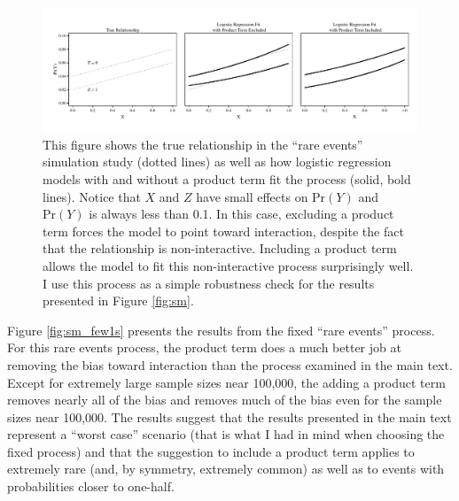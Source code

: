 \documentclass[12pt]{article}
\begin{document}
\begin{appendix}
\begin{figure}[H]
\begin{center}
\includegraphics[width=\linewidth]{fig/fig_example_few1s.pdf}
\end{center}
\caption{This figure shows the true relationship in the ``rare events''  simulation study (dotted lines) as well as how logistic regression models with and without a product term fit the process (solid, bold lines). Notice that $X$ and $Z$ have small effects on $\text{Pr}(Y)$ and $\text{Pr}(Y)$ is always less than 0.1. In this case, excluding a product term forces the model to point toward interaction, despite the fact that the relationship is non-interactive. Including a product term allows the model to fit this non-interactive process surprisingly well. I use this process as a simple robustness check for the results presented in Figure \ref{fig:sm}.}\label{fig:relationships_fits_few1s}
\end{figure}

Figure \ref{fig:sm_few1s} presents the results from the fixed ``rare events'' process. For this rare events process, the product term does a much better job at removing the bias toward interaction than the process examined in the main text. Except for extremely large sample sizes near 100,000, the adding a product term removes nearly all of the bias and removes much of the bias even for the sample sizes near 100,000. The results suggest that the results presented in the main text represent a ``worst case'' scenario (that is what I had in mind when choosing the fixed process) and that the suggestion to include a product term applies to extremely rare (and, by symmetry, extremely common) as well as to events with probabilities closer to one-half.  


\end{appendix}
\end{document}
